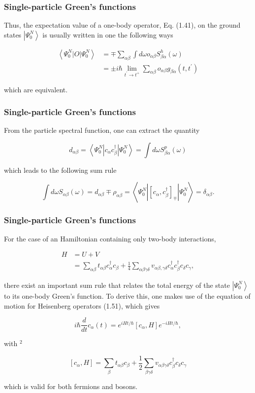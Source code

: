 \documentclass[compress]{beamer}
\begin{document}
\frame
{
\frametitle{Single-particle Green's functions}
\begin{small}
{\scriptsize
Thus, the expectation value of a one-body operator, Eq. (1.41), on the
ground states $\left|\Psi_{0}^{N}\right\rangle$ is usually written in
one the following ways

$$
\begin{aligned}
\left\langle\Psi_{0}^{N}|O| \Psi_{0}^{N}\right\rangle & =\mp \sum_{\alpha \beta} \int d \omega o_{\alpha \beta} S_{\beta \alpha}^{h}(\omega) \\
& = \pm i \hbar \lim _{t^{\prime} \rightarrow t^{+}} \sum_{\alpha \beta} o_{\alpha \beta} g_{\beta \alpha}\left(t, t^{\prime}\right)
\end{aligned}
$$

which are equivalent.

}
\end{small}
}


\frame
{
\frametitle{Single-particle Green's functions}
\begin{small}
{\scriptsize
From the particle spectral function, one can extract the quantity

$$
d_{\alpha \beta}=\left\langle\Psi_{0}^{N}\left|c_{\alpha} c_{\beta}^{\dagger}\right| \Psi_{0}^{N}\right\rangle=\int d \omega S_{\beta \alpha}^{p}(\omega)
$$

which leads to the following sum rule

$$
\int d \omega S_{\alpha \beta}(\omega)=d_{\alpha \beta} \mp \rho_{\alpha \beta}=\left\langle\Psi_{0}^{N}\left|\left[c_{\alpha}, c_{\beta}^{\dagger}\right]_{\mp}\right| \Psi_{0}^{N}\right\rangle=\delta_{\alpha \beta} .
$$

}
\end{small}
}
\frame
{
\frametitle{Single-particle Green's functions}
\begin{small}
{\scriptsize
For the case of an Hamiltonian containing only two-body interactions,

$$
\begin{aligned}
H & =U+V \\
& =\sum_{\alpha \beta} t_{\alpha \beta} c_{\alpha}^{\dagger} c_{\beta}+\frac{1}{4} \sum_{\alpha \beta \gamma \delta} v_{\alpha \beta, \gamma \delta} c_{\alpha}^{\dagger} c_{\beta}^{\dagger} c_{\delta} c_{\gamma},
\end{aligned}
$$

there exist an important sum rule that relates the total energy of the state $\left|\Psi_{0}^{N}\right\rangle$ to its one-body Green's function. To derive this, one makes use of the equation of motion for Heisenberg operators (1.51), which gives

$$
i \hbar \frac{d}{d t} c_{\alpha}(t)=e^{i H t / \hbar}\left[c_{\alpha}, H\right] e^{-i H t / \hbar},
$$

with $^{2}$

$$
\left[c_{\alpha}, H\right]=\sum_{\beta} t_{\alpha \beta} c_{\beta}+\frac{1}{2} \sum_{\beta \gamma \delta} v_{\alpha \beta \gamma \delta} c_{\beta}^{\dagger} c_{\delta} c_{\gamma}
$$

which is valid for both fermions and bosons.

}
\end{small}
}
\end{document}

